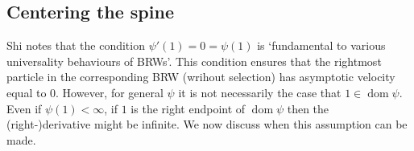 \subsection{Centering the spine}\label{subsec:centering_the_spine}
Shi \cite{gantert2008asymptotics} notes that the condition $\psi'(1) = 0 = \psi(1)$ is `fundamental to various universality behaviours of BRWs'. This condition ensures that the rightmost particle in the corresponding BRW (wrihout selection) has asymptotic velocity equal to $0$. However, for general $\psi$ it is not necessarily the case that $1 \in \operatorname*{dom}\psi$. Even if $\psi(1) < \infty$, if $1$ is the right endpoint of $\operatorname*{dom}\psi$ then the (right-)derivative might be infinite. We now discuss when this assumption can be made. \\

